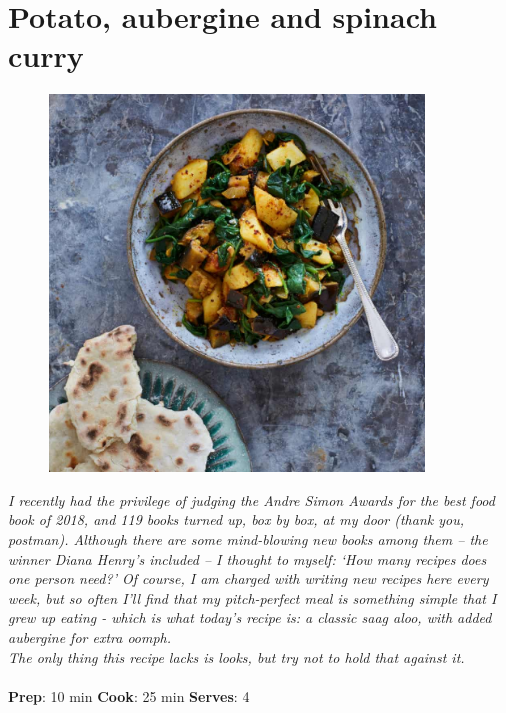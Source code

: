 \documentclass{book}
\begin{document}
\section{Potato, aubergine and spinach curry}
\begin{figure}
\centering\includegraphics[width=10cm,height=10cm,keepaspectratio]{Recipe_Pictures/Potato,_aubergine_and_spinach_curry.png}
\end{figure}
\emph{I recently had the privilege of judging the Andre Simon Awards for the best food book of 2018, and 119 books turned up, box by box, at my door (thank you, postman). Although there are some mind-blowing new books among them – the winner Diana Henry’s included – I thought to myself: ‘How many recipes does one person need?’ Of course, I am charged with writing new recipes here every week, but so often I’ll find that my pitch-perfect meal is something simple that I grew up eating - which is what today’s recipe is: a classic saag aloo, with added aubergine for extra oomph.\\ 
The only thing this recipe lacks is looks, but try not to hold that against it.}\\\\ 
\textbf{Prep}: 10 min
\textbf{Cook}: 25 min
\textbf{Serves}: 4
\end{document}
